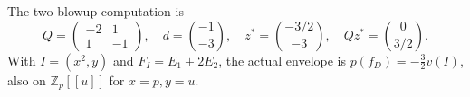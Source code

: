 The two-blowup computation is
\[
 Q=\begin{pmatrix}-2&1\\1&-1\end{pmatrix},\quad
 d=\binom{-1}{-3},\quad z^*=\binom{-3/2}{-3},\quad
 Qz^*=\binom0{3/2}.
\]
With $I=(x^2,y)$ and $F_I=E_1+2E_2$, the actual envelope is
$p(f_D)=-\tfrac32 v(I)$, also on $\mathbb Z_p[[u]]$ for $x=p,y=u$.
